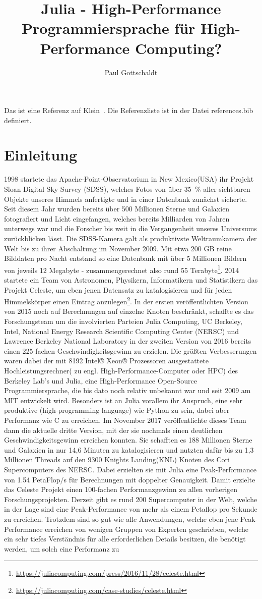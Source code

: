\documentclass[proseminar,german,utf8]{zihpub}
\author{Paul Gottschaldt}
\title{Julia - High-Performance Programmiersprache für High-Performance Computing?}
\begin{document}
Das ist eine Referenz auf Klein~\cite{blackholes}. Die Referenzliste ist in der Datei references.bib definiert.
\section {Einleitung}
1998 startete das Apache-Point-Observatorium in New Mexico(USA) ihr Projekt Sloan Digital Sky Survey (SDSS), welches Fotos von über 35~\% aller sichtbaren Objekte unseres Himmels anfertigte und in einer Datenbank zunächst sicherte. Seit diesem Jahr wurden bereits über 500 Millionen Sterne und Galaxien fotografiert und Licht eingefangen, welches bereits Milliarden von Jahren unterwegs war und die Forscher bis weit in die Vergangenheit unseres Universums zurückblicken lässt. Die SDSS-Kamera galt als produktivste Weltraumkamera der Welt bis zu ihrer Abschaltung im November 2009. Mit etwa 200 GB reine Bilddaten pro Nacht entstand so eine Datenbank mit über 5 Millionen Bildern von jeweils 12 Megabyte - zusammengerechnet also rund 55 Terabyte\footnote{\url{https://juliacomputing.com/press/2016/11/28/celeste.html}}. 2014 startete ein Team von Astronomen, Physikern, Informatikern und Statistikern das Projekt Celeste, um eben jenen Datensatz zu katalogisieren und für jeden Himmelskörper einen Eintrag anzulegen\footnote{\url{https://juliacomputing.com/case-studies/celeste.html}}. In der ersten veröffentlichten Version von 2015 noch auf Berechnungen auf einzelne Knoten beschränkt, schaffte es das Forschungsteam um die involvierten Parteien Julia Computing, UC Berkeley, Intel, National Energy Research Scientific Computing Center (NERSC) und Lawrence Berkeley National Laboratory in der zweiten Version von 2016 bereits einen 225-fachen Geschwindigkeitsgewinn zu erzielen. Die größten Verbesserungen waren dabei der mit 8192 Intel® Xeon® Prozessoren ausgestattete Hochleistungsrechner( zu engl. High-Performance-Computer oder HPC) des Berkeley Lab's und Julia, eine High-Performance Open-Source Programmiersprache, die bis dato noch relativ unbekannt war und seit 2009 am MIT entwickelt wird. Besonders ist an Julia vorallem ihr Anspruch, eine sehr produktive (high-programming language) wie Python zu sein, dabei aber Performanz wie C zu erreichen. Im November 2017 veröffentlichte dieses Team dann die aktuelle dritte Version, mit der sie nochmals einen deutlichen Geschwindigkeitsgewinn erreichen konnten. Sie schafften es 188 Millionen Sterne und Galaxien in nur 14,6 Minuten zu katalogisieren und nutzten dafür bis zu 1,3 Millionen Threads auf den 9300 Knights Landing(KNL) Knoten des Cori Supercomputers des NERSC. Dabei erzielten sie mit Julia eine Peak-Performance von 1.54 PetaFlop/s für Berechnungen mit doppelter Genauigkeit. Damit erzielte das Celeste Projekt einen 100-fachen Performanzgewinn zu allen vorherigen Forschungsprojekten. Derzeit gibt es rund 200 Supercomputer in der Welt, welche in der Lage sind eine Peak-Performance von mehr als einem Petaflop pro Sekunde zu erreichen. Trotzdem sind so gut wie alle Anwendungen, welche eben jene Peak-Performance erreichen von wenigen Gruppen von Experten geschrieben, welche ein sehr tiefes Verständnis für alle erforderlichen Details besitzen, die benötigt werden, um solch eine Performanz zu 
\end{document}
